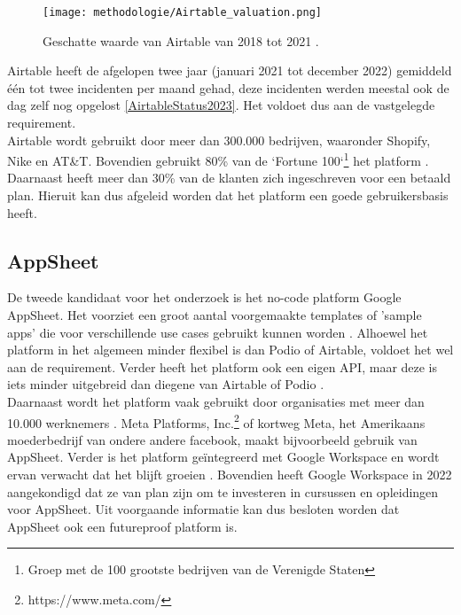 \begin{figure}[h]
    \centering
    \texttt{[image: methodologie/Airtable\_valuation.png]}
    \caption[Geschatte waarde Airtable]{Geschatte waarde van Airtable van 2018 tot 2021 \autocite{Khemchandani2023}.}
    \label{fig:airtable_value}
\end{figure}

Airtable heeft de afgelopen twee jaar (januari 2021 tot december 2022) gemiddeld één tot twee incidenten per maand gehad, deze incidenten werden meestal ook de dag zelf nog opgelost \autoref{AirtableStatus2023}. Het voldoet dus aan de vastgelegde requirement. \\

Airtable wordt gebruikt door meer dan 300.000 bedrijven, waaronder Shopify, Nike en AT\&T. Bovendien gebruikt 80\% van de `Fortune 100`\footnote{Groep met de 100 grootste bedrijven van de Verenigde Staten} het platform \autocite{Prokopets2022}. Daarnaast heeft meer dan 30\% van de klanten zich ingeschreven voor een betaald plan. Hieruit kan dus afgeleid worden dat het platform een goede gebruikersbasis heeft. \\


\subsection{AppSheet}

De tweede kandidaat voor het onderzoek is het no-code platform Google AppSheet. Het voorziet een groot aantal voorgemaakte templates of 'sample apps' die voor verschillende use cases gebruikt kunnen worden \autocite{AppSheetTemplates}. Alhoewel het platform in het algemeen minder flexibel is dan Podio of Airtable, voldoet het wel aan de requirement. Verder heeft het platform ook een eigen API, maar deze is iets minder uitgebreid dan diegene van Airtable of Podio \autocite{AppSheetAPI}. \\

Daarnaast wordt het platform vaak gebruikt door organisaties met meer dan 10.000 werknemers \autocite{Enlyft}. Meta Platforms, Inc.\footnote{https://www.meta.com/} of kortweg Meta, het Amerikaans moederbedrijf van ondere andere facebook, maakt bijvoorbeeld gebruik van AppSheet. Verder is het platform geïntegreerd met Google Workspace en wordt ervan verwacht dat het blijft groeien \autocite{Anand2022}. Bovendien heeft Google Workspace in 2022 aangekondigd dat ze van plan zijn om te investeren in cursussen en opleidingen voor AppSheet. Uit voorgaande informatie kan dus besloten worden dat AppSheet ook een futureproof platform is. \\ 


